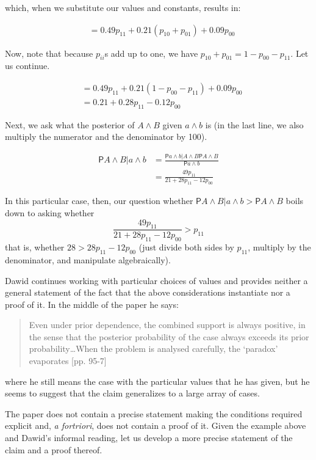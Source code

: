 \documentclass[10pt,dvipsnames,enabledeprecatedfontcommands]{scrartcl}
\newcommand{\et}{\wedge}
\newcommand{\pr}{\mathsf{P}}
\begin{document}
\noindent which, when we substitute our values and constants, results
in:

\begin{align*}
                     & = 0.49p_{11}+0.21(p_{10}+p_{01})+0.09p_{00}
 \end{align*}

Now, note that because \(p_{ii}\)s add up to one, we have
\(p_{10}+p_{01}=1-p_{00}-p_{11}\). Let us continue.

\begin{align*}
    & = 0.49p_{11}+0.21(1-p_{00}-p_{11})+0.09p_{00} \\
                     & = 0.21+0.28p_{11}-0.12p_{00}
 \end{align*}

Next, we ask what the posterior of \(A\et B\) given \(a\et b\) is (in
the last line, we also multiply the numerator and the denominator by
100).

\begin{align*}
 \pr{A\et B\vert a \et b} & =
         \frac{\pr{a\et b \vert A \et B}\pr{A\et B}}
             {\pr{a\et b}}\\
         & =
                     \frac{49p_{11}}
                           {21+28p_{11}-12p_{00}} 
         \end{align*}

In this particular case, then, our question whether
\(\pr{A\et B\vert a\et b}>\pr{A\et B}\) boils down to asking whether
\[\frac{49p_{11}}{21+28p_{11}-12p_{00}}> p_{11}\] that is, whether
\(28 > 28 p_{11}-12p_{00}\) (just divide both sides by \(p_{11}\),
multiply by the denominator, and manipulate algebraically).

Dawid continues working with particular choices of values and provides
neither a general statement of the fact that the above considerations
instantiate nor a proof of it. In the middle of the paper he says:

\begin{quote}
 Even under prior dependence, the combined support is always positive, in the sense that the posterior probability of the case always exceeds its prior probability\dots When the problem is analysed carefully, the `paradox' evaporates [pp. 95-7]\end{quote}

\noindent where he still means the case with the particular values that
he has given, but he seems to suggest that the claim generalizes to a
large array of cases.

The paper does not contain a precise statement making the conditions
required explicit and, \emph{a fortriori}, does not contain a proof of
it. Given the example above and Dawid's informal reading, let us develop
a more precise statement of the claim and a proof thereof.
\end{document}
